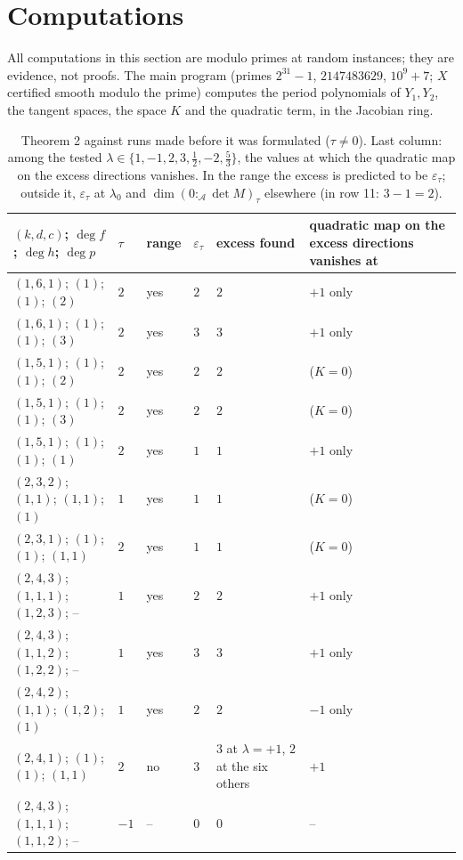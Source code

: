\documentclass[11pt]{article}
\numberwithin{equation}{section}
\theoremstyle{remark}
\newcommand{\cA}{\mathcal{A}}
\newcommand{\lz}{\lambda_0}
\newcommand{\et}{\varepsilon_\tau}
\begin{document}
\section{Computations}\label{sec:comp}

All computations in this section are modulo primes at random instances; they are evidence, not proofs. The main
program (primes $2^{31}-1$, $2147483629$, $10^9+7$; $X$ certified smooth modulo the prime) computes the period
polynomials of $Y_1,Y_2$, the tangent spaces, the space $K$ and the quadratic term, in the Jacobian ring.

\begin{table}[h]\centering\small
\begin{tabular}{llll>{\raggedright\arraybackslash}p{}>{\raggedright\arraybackslash}p{}}
\toprule
$(k,d,c)$; $\deg f$; $\deg h$; $\deg p$ & $\tau$ & range & $\et$ & excess found & quadratic map on the excess
directions vanishes at\\
\midrule
$(1,6,1)$; $(1)$; $(1)$; $(2)$ & $2$ & yes & $2$ & $2$ & $+1$ only\\
$(1,6,1)$; $(1)$; $(1)$; $(3)$ & $2$ & yes & $3$ & $3$ & $+1$ only\\
$(1,5,1)$; $(1)$; $(1)$; $(2)$ & $2$ & yes & $2$ & $2$ & ($K=0$)\\
$(1,5,1)$; $(1)$; $(1)$; $(3)$ & $2$ & yes & $2$ & $2$ & ($K=0$)\\
$(1,5,1)$; $(1)$; $(1)$; $(1)$ & $2$ & yes & $1$ & $1$ & $+1$ only\\
$(2,3,2)$; $(1,1)$; $(1,1)$; $(1)$ & $1$ & yes & $1$ & $1$ & ($K=0$)\\
$(2,3,1)$; $(1)$; $(1)$; $(1,1)$ & $2$ & yes & $1$ & $1$ & ($K=0$)\\
$(2,4,3)$; $(1,1,1)$; $(1,2,3)$; -- & $1$ & yes & $2$ & $2$ & $+1$ only\\
$(2,4,3)$; $(1,1,2)$; $(1,2,2)$; -- & $1$ & yes & $3$ & $3$ & $+1$ only\\
$(2,4,2)$; $(1,1)$; $(1,2)$; $(1)$ & $1$ & yes & $2$ & $2$ & $-1$ only\\
$(2,4,1)$; $(1)$; $(1)$; $(1,1)$ & $2$ & no & $3$ & $3$ at $\lambda=+1$, $2$ at the six others & $+1$\\
$(2,4,3)$; $(1,1,1)$; $(1,1,2)$; -- & $-1$ & -- & $0$ & $0$ & --\\
\bottomrule
\end{tabular}
\caption{Theorem 2 against runs made before it was formulated ($\tau\ne0$). Last column: among the tested
$\lambda\in\{1,-1,2,3,\frac12,-2,\frac53\}$, the values at which the quadratic map on the excess directions
vanishes. In the range the excess is predicted to be $\et$; outside it, $\et$ at $\lz$ and
$\dim(0:_\cA\det M)_\tau$ elsewhere (in row 11: $3-1=2$).}\label{tab:tau}
\end{table}
\end{document}
